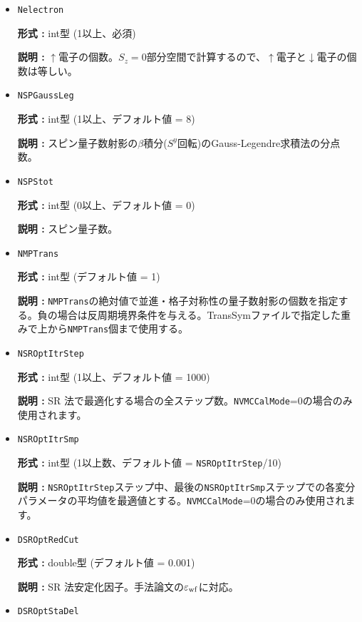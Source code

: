 \begin{itemize}
{\bf 説明 :} サイト数を指定する整数。  

\item  \verb|Nelectron|

{\bf 形式 :} {int型 (1以上、必須)}

{\bf 説明 :} $\uparrow$電子の個数。$S_z=0$部分空間で計算するので、$\uparrow$電子と$\downarrow$電子の個数は等しい。

 \item  \verb|NSPGaussLeg|

{\bf 形式 :} {int型 (1以上、デフォルト値 = 8)}

{\bf 説明 :} スピン量子数射影の$\beta$積分($S^y$回転)のGauss-Legendre求積法の分点数。

 \item  \verb|NSPStot|

{\bf 形式 :} int型 (0以上、デフォルト値 = 0)

{\bf 説明 :}  スピン量子数。

 \item  \verb|NMPTrans|

{\bf 形式 :} int型 (デフォルト値 = 1)

{\bf 説明 :} 
\verb|NMPTrans|の絶対値で並進・格子対称性の量子数射影の個数を指定する。負の場合は反周期境界条件を与える。TransSymファイルで指定した重みで上から\verb|NMPTrans|個まで使用する。

 \item  \verb|NSROptItrStep|

{\bf 形式 :} int型 (1以上、デフォルト値 = 1000)

{\bf 説明 :} 
SR 法で最適化する場合の全ステップ数。\verb|NVMCCalMode|=0の場合のみ使用されます。
 
 \item  \verb|NSROptItrSmp|

{\bf 形式 :} int型 (1以上数、デフォルト値 = \verb|NSROptItrStep|/10)

{\bf 説明 :} \verb|NSROptItrStep|ステップ中、最後の\verb|NSROptItrSmp|ステップでの各変分パラメータの平均値を最適値とする。\verb|NVMCCalMode|=0の場合のみ使用されます。

\item   \verb|DSROptRedCut|
   
{\bf 形式 :} double型 (デフォルト値 = 0.001)

{\bf 説明 :} SR 法安定化因子。手法論文\cite{Tahara2008}の$\varepsilon_{\rm wf}$に対応。

 \item  \verb|DSROptStaDel| 
   

\end{itemize}
